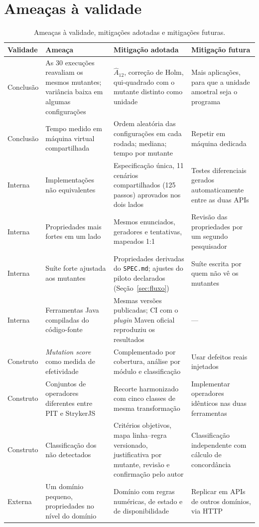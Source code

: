 \section{Ameaças à validade}
\label{ap:ameacas}

\begin{table}[H]
\centering
\caption{Ameaças à validade, mitigações adotadas e mitigações futuras.}
\label{tab:ameacas}
\small
\begin{tabularx}{\textwidth}{@{}l Y Y Y@{}}
\toprule
Validade & Ameaça & Mitigação adotada & Mitigação futura \\
\midrule
Conclusão & As 30 execuções reavaliam os mesmos mutantes; variância baixa em algumas configurações & $\hat{A}_{12}$, correção de Holm, qui-quadrado com o mutante distinto como unidade & Mais aplicações, para que a unidade amostral seja o programa \\
Conclusão & Tempo medido em máquina virtual compartilhada & Ordem aleatória das configurações em cada rodada; mediana; tempo por mutante & Repetir em máquina dedicada \\
Interna & Implementações não equivalentes & Especificação única, 11 cenários compartilhados (125 passos) aprovados nos dois lados & Testes diferenciais gerados automaticamente entre as duas APIs \\
Interna & Propriedades mais fortes em um lado & Mesmos enunciados, geradores e tentativas, mapeados 1:1 & Revisão das propriedades por um segundo pesquisador \\
Interna & Suíte forte ajustada aos mutantes & Propriedades derivadas do \texttt{SPEC.md}; ajustes do piloto declarados (Seção~\ref{sec:fluxo}) & Suíte escrita por quem não vê os mutantes \\
Interna & Ferramentas Java compiladas do código-fonte & Mesmas versões publicadas; CI com o \textit{plugin} Maven oficial reproduziu os resultados & --- \\
Construto & \textit{Mutation score} como medida de efetividade & Complementado por cobertura, análise por módulo e classificação & Usar defeitos reais injetados \\
Construto & Conjuntos de operadores diferentes entre PIT e StrykerJS & Recorte harmonizado com cinco classes de mesma transformação & Implementar operadores idênticos nas duas ferramentas \\
Construto & Classificação dos não detectados & Critérios objetivos, mapa linha--regra versionado, justificativa por mutante, revisão e confirmação pelo autor & Classificação independente com cálculo de concordância \\
Externa & Um domínio pequeno, propriedades no nível do domínio & Domínio com regras numéricas, de estado e de disponibilidade & Replicar em APIs de outros domínios, via HTTP \\
\bottomrule
\end{tabularx}
\end{table}
